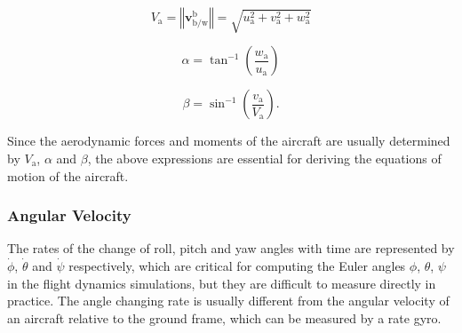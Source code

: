 \begin{equation}
{V_{\text{a}}}=\left\Vert {\mathbf{v}_{\text{b/w}}^{\text{b}}}\right\Vert =\sqrt{u_{\text{a}}^{2}+v_{\text{a}}^{2}+w_{\text{a}}^{2}}\label{eq:2.37}
\end{equation}

\begin{equation}
\alpha={\tan^{-1}}\left({\frac{{w_{\text{a}}}}{{u_{\text{a}}}}}\right)\label{eq:2.38}
\end{equation}

\begin{equation}
\beta={\sin^{-1}}\left({\frac{{v_{\text{a}}}}{{V_{\text{a}}}}}\right).\label{eq:2.39}
\end{equation}

Since the aerodynamic forces and moments of the aircraft are usually
determined by ${{V}_{\text{a}}}$, $\alpha$ and $\beta$, the above
expressions are essential for deriving the equations of motion of
the aircraft.

\subsubsection{Angular Velocity}

The rates of the change of roll, pitch and yaw angles with time are
represented by $\dot{\phi}$, $\dot{\theta}$ and $\dot{\psi}$ respectively,
which are critical for computing the Euler angles $\phi$, $\theta$,
$\psi$ in the flight dynamics simulations, but they are difficult
to measure directly in practice. The angle changing rate is usually
different from the angular velocity of an aircraft relative to the
ground frame, which can be measured by a rate gyro. 

